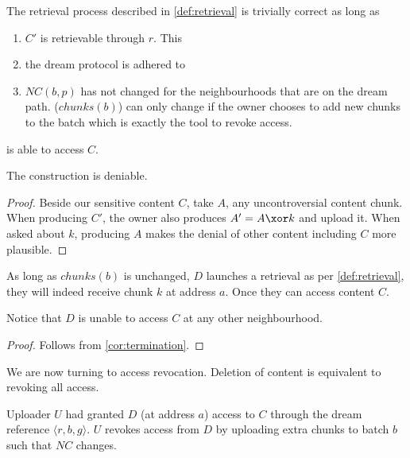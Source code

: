 \begin{lemma}
The retrieval process described in \ref{def:retrieval} is trivially correct as long as 
\begin{enumerate}
    \item  $C'$ is retrievable through $r$. This 
    \item the dream protocol is adhered to
    \item $\mathit{NC}(b,p)$ has not changed for the neighbourhoods that are on the dream path. ($\mathit{chunks(b)}$) can only change if the owner chooses to add new chunks to the  batch which is exactly the tool to revoke access.
\end{enumerate}
\end{lemma}
is able to access $C$.


\begin{corollary}
\label{cor:deniable}
The construction is deniable.

\begin{proof}
Beside our sensitive content $C$, take $A$, any uncontroversial content chunk. When producing $C'$, the owner also produces  $A'=A\xor k$ and upload it. When asked about $k$, producing $A$ makes the denial of other content including $C$ more plausible. \qedsymbol
\end{proof}
\end{corollary}

\begin{theorem}
\label{the:accessm}
As long as $\mathit{chunks}(b)$ is unchanged, $D$ launches a retrieval as per \ref{def:retrieval}, they will indeed receive chunk $k$ at address $a$. Once they can access content $C$.

Notice that  $D$ is unable to access $C$ at any other neighbourhood.
\begin{proof}
Follows from \ref{cor:termination}.   \qedsymbol
\end{proof}
\end{theorem}

We are now turning to access revocation. Deletion of content is equivalent to revoking all access.

\begin{definition}
\label{def:revoking}

Uploader $U$ had granted $D$ (at address $a$) access to $C$ through the dream reference $\langle r,b,g\rangle $. $U$ revokes access from $D$ by uploading extra chunks to batch $b$ such that $\mathit{NC}$ changes.
\end{definition}

